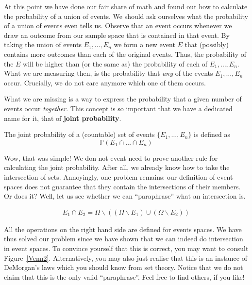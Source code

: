 At this point we have done our fair share of math and found out how to calculate the probability of a union
of events. We should ask ourselves what the probability of a union of events even tells us. Observe that an event 
occurs whenever we draw an outcome from our sample space that is contained in that event. By taking the union
of events $ E_{1}, \ldots, E_{n} $ we form a new event $ E $ that (possibly) contains more outcomes than each 
of the original events. Thus, the probability of the $ E $ will be higher than (or the same as) the 
probability of each of $ E_{1}, \ldots, E_{n} $. What we are measuring then, is the probability that 
\textit{any} of the events $ E_{1}, \ldots, E_{n} $ occur. Crucially, we do not care anymore which one of them
occurs.

What we are missing is a way to express the probability that a given number of events occur 
\textit{together}. This concept is so important that we have a dedicated name for it, that of 
\textbf{joint probability}.

\begin{Definition}
The joint probability of a (countable) set of events $ \{E_{1}, \ldots, E_{n}\} $ is defined as
$$ \mathbb{P}(E_{1} \cap \ldots \cap E_{n}) $$
\end{Definition}

Wow, that was simple! We don not event need to prove another rule for calculating the joint probability.
After all, we already know how to take the intersection of sets. Annoyingly, one problem remains: our
definition of event spaces does not guarantee that they contain the intersections of their members. Or does 
it? Well, let us see whether we can ``paraphrase'' what an intersection is.

\begin{align}
E_{1} \cap E_{2} = \Omega \backslash ((\Omega \backslash E_{1}) \cup (\Omega \backslash E_{2}))
\end{align}

All the operations on the right hand side are defined for events spaces. We have thus solved our problem since
we have shown that we can indeed do intersection in event spaces.
To convince yourself that this is correct, you may want to consult Figure~\ref{Venn2}. Alternatively, you
may also just realise that this is an instance of DeMorgan's laws which you should know from set theory.
Notice that we do not claim that this is the only valid ``paraphrase''. Feel free to find others, if you like!



